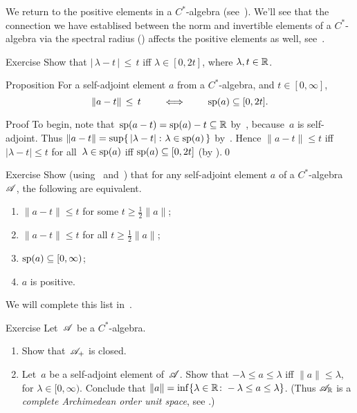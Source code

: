\documentclass[main]{subfiles}
\begin{document}
\begin{parsec}%
\begin{point}%
We return to the positive elements 
in a $C^*$-algebra (see~).
We'll see that the connection we have establised
between the norm and invertible elements
of a $C^*$-algebra
via the spectral radius ()
affects the positive elements as well, see~.
\end{point}
\begin{point}{Exercise}%
Show that 
$\left|\,\lambda-t\,\right| \,\leq\, t$ iff  $\lambda \in[0,2t]$,
where $\lambda,t\in\mathbb{R}$.
\end{point}
\begin{point}{Proposition}%
For a self-adjoint element $a$ from a $C^*$-algebra,
and $t\in [0,\infty]$, 
\begin{equation*}
\|a-t\|\,\leq\, t\qquad\iff\qquad \mathrm{sp}(a)\subseteq [0,2t].
\end{equation*}%
\begin{point}{Proof}%
To begin, note that~$\mathrm{sp}(a-t)=\mathrm{sp}(a)-t\subseteq \mathbb{R}$ 
by~,
because~$a$ is self-adjoint.
Thus $\|a-t\|=\sup\{\,\left|\lambda-t\right|\colon \lambda\in \mathrm{sp}(a)\,\}$
by~.
Hence $\|a-t\|\leq t$
iff $\left|\lambda-t\right|\leq t$ for all~$\lambda\in\mathrm{sp}(a)$
iff $\mathrm{sp}(a)\subseteq [0,2t]$ (by ).\qed
\end{point}
\begin{point}{Exercise}%
Show
(using~ and~)
that
for any self-adjoint element $a$ of a $C^*$-algebra~$\mathscr{A}$,
the following are equivalent.
\begin{enumerate}
\item 
\label{cstar-pos-1}
$\|a-t\|\leq t$
for some $t\geq \frac{1}{2}\|a\|$;
\item 
\label{cstar-pos-2}
$\|a-t\|\leq t$
for all $t\geq \frac{1}{2}\|a\|$;
\item 
\label{cstar-pos-3}
$\mathrm{sp}(a)\subseteq[0,\infty)$;
\item
$a$ is positive.
\end{enumerate}
We will complete this list in~.
\end{point}
\end{point}
\begin{point}{Exercise}%
Let~$\mathscr{A}$ be a $C^*$-algebra.
\begin{enumerate}
\item
Show that~$\mathscr{A}_{+}$ is closed.
\item
Let~$a$ be a self-adjoint element of~$\mathscr{A}$.
Show that
 $-\lambda \leq a\leq \lambda$
iff $\|a\|\leq \lambda$,
for $\lambda\in [0,\infty)$.
Conclude that $\|a\| = \inf\{ \lambda \in \mathbb{R}\colon 
-\lambda \leq a\leq \lambda\}$.
(Thus $\mathscr{A}_{\mathbb{R}}$ is a \emph{complete Archimedean order unit space},
see \TODO{}.)


\end{enumerate}
\end{point}
\end{parsec}
\end{document}
